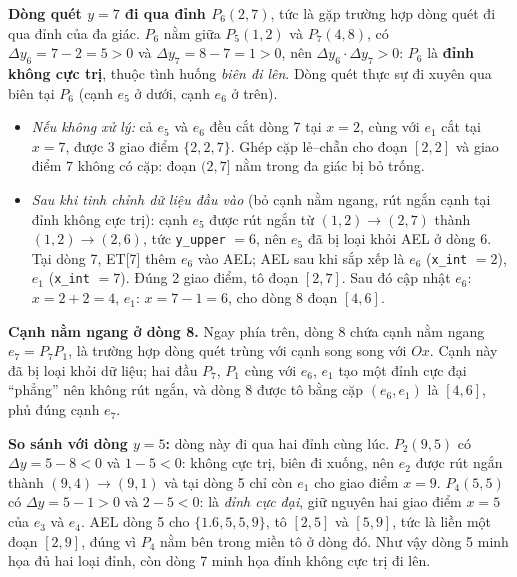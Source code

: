 \textbf{Dòng quét $y = 7$ đi qua đỉnh $P_6(2, 7)$}, tức là gặp trường hợp dòng quét đi qua đỉnh của đa giác. $P_6$ nằm giữa $P_5(1,2)$ và $P_7(4,8)$, có $\Delta y_6 = 7 - 2 = 5 > 0$ và $\Delta y_7 = 8 - 7 = 1 > 0$, nên $\Delta y_6 \cdot \Delta y_7 > 0$: $P_6$ là \textbf{đỉnh không cực trị}, thuộc tình huống \emph{biên đi lên}. Dòng quét thực sự đi xuyên qua biên tại $P_6$ (cạnh $e_5$ ở dưới, cạnh $e_6$ ở trên).
\begin{itemize}
    \item \emph{Nếu không xử lý:} cả $e_5$ và $e_6$ đều cắt dòng 7 tại $x = 2$, cùng với $e_1$ cắt tại $x = 7$, được 3 giao điểm $\{2, 2, 7\}$. Ghép cặp lẻ--chẵn cho đoạn $[2, 2]$ và giao điểm $7$ không có cặp: đoạn $(2, 7]$ nằm trong đa giác bị bỏ trống.
    \item \emph{Sau khi tinh chỉnh dữ liệu đầu vào} (bỏ cạnh nằm ngang, rút ngắn cạnh tại đỉnh không cực trị): cạnh $e_5$ được rút ngắn từ $(1,2) \to (2,7)$ thành $(1,2) \to (2,6)$, tức \texttt{y\_upper} $= 6$, nên $e_5$ đã bị loại khỏi AEL ở dòng 6. Tại dòng 7, ET[7] thêm $e_6$ vào AEL; AEL sau khi sắp xếp là $e_6$ (\texttt{x\_int} $= 2$), $e_1$ (\texttt{x\_int} $= 7$). Đúng 2 giao điểm, tô đoạn $[2, 7]$. Sau đó cập nhật $e_6$: $x = 2 + 2 = 4$, $e_1$: $x = 7 - 1 = 6$, cho dòng 8 đoạn $[4, 6]$.
\end{itemize}
\textbf{Cạnh nằm ngang ở dòng 8.} Ngay phía trên, dòng 8 chứa cạnh nằm ngang $e_7 = P_7P_1$, là trường hợp dòng quét trùng với cạnh song song với $Ox$. Cạnh này đã bị loại khỏi dữ liệu; hai đầu $P_7$, $P_1$ cùng với $e_6$, $e_1$ tạo một đỉnh cực đại ``phẳng'' nên không rút ngắn, và dòng 8 được tô bằng cặp $(e_6, e_1)$ là $[4, 6]$, phủ đúng cạnh $e_7$.

\textbf{So sánh với dòng $y = 5$:} dòng này đi qua hai đỉnh cùng lúc. $P_2(9,5)$ có $\Delta y = 5 - 8 < 0$ và $1 - 5 < 0$: không cực trị, biên đi xuống, nên $e_2$ được rút ngắn thành $(9,4) \to (9,1)$ và tại dòng 5 chỉ còn $e_1$ cho giao điểm $x = 9$. $P_4(5,5)$ có $\Delta y = 5 - 1 > 0$ và $2 - 5 < 0$: là \emph{đỉnh cực đại}, giữ nguyên hai giao điểm $x = 5$ của $e_3$ và $e_4$. AEL dòng 5 cho $\{1.6, 5, 5, 9\}$, tô $[2, 5]$ và $[5, 9]$, tức là liền một đoạn $[2, 9]$, đúng vì $P_4$ nằm bên trong miền tô ở dòng đó. Như vậy dòng 5 minh họa đủ hai loại đỉnh, còn dòng 7 minh họa đỉnh không cực trị đi lên.

